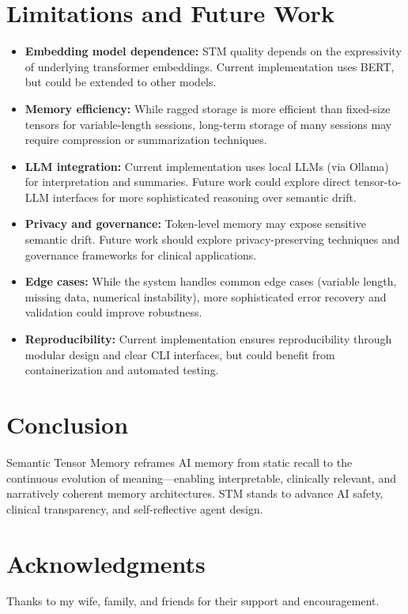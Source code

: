 \documentclass[11pt]{article}
\begin{document}
\section{Limitations and Future Work}
\begin{itemize}[leftmargin=2em]
    \item \textbf{Embedding model dependence:} STM quality depends on the expressivity of underlying transformer embeddings. Current implementation uses BERT, but could be extended to other models.
    
    \item \textbf{Memory efficiency:} While ragged storage is more efficient than fixed-size tensors for variable-length sessions, long-term storage of many sessions may require compression or summarization techniques.
    
    \item \textbf{LLM integration:} Current implementation uses local LLMs (via Ollama) for interpretation and summaries. Future work could explore direct tensor-to-LLM interfaces for more sophisticated reasoning over semantic drift.
    
    \item \textbf{Privacy and governance:} Token-level memory may expose sensitive semantic drift. Future work should explore privacy-preserving techniques and governance frameworks for clinical applications.
    
    \item \textbf{Edge cases:} While the system handles common edge cases (variable length, missing data, numerical instability), more sophisticated error recovery and validation could improve robustness.
    
    \item \textbf{Reproducibility:} Current implementation ensures reproducibility through modular design and clear CLI interfaces, but could benefit from containerization and automated testing.
\end{itemize}

\section{Conclusion}
Semantic Tensor Memory reframes AI memory from static recall to the continuous evolution of meaning---enabling interpretable, clinically relevant, and narratively coherent memory architectures. STM stands to advance AI safety, clinical transparency, and self-reflective agent design.

\section*{Acknowledgments}
Thanks to my wife, family, and friends for their support and encouragement.



\end{document}
